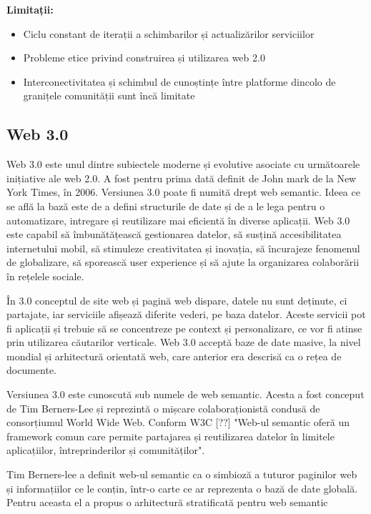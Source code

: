 \documentclass[12pt, a4paper]{report}
\begin{document}
\textbf{Limitații:}
\begin{itemize}
	\item Ciclu constant de iterații a schimbarilor și actualizărilor serviciilor
	\item Probleme etice privind construirea și utilizarea web 2.0
	\item Interconectivitatea și schimbul de cunoștințe între platforme dincolo de granițele comunității sunt încă limitate
\end{itemize}

\subsection{Web 3.0}

Web 3.0 este unul dintre subiectele moderne și evolutive asociate cu următoarele inițiative ale web 2.0. A fost pentru prima dată definit de John mark de la New York Times, în 2006. Versiunea 3.0 poate fi numită drept web semantic. Ideea ce se află la bază este de a defini structurile de date și de a le lega pentru o automatizare, intregare și reutilizare mai eficientă în diverse aplicații. Web 3.0 este capabil să îmbunătățească gestionarea datelor, să susțină accesibilitatea internetului mobil, să stimuleze creativitatea și inovația, să încurajeze fenomenul de globalizare, să sporească user experience și să ajute la organizarea colaborării în rețelele sociale.

În 3.0 conceptul de site web și pagină web dispare, datele nu sunt deținute, ci partajate, iar serviciile afișează diferite vederi, pe baza datelor. Aceste servicii pot fi aplicații și trebuie să se concentreze pe context și personalizare, ce vor fi atinse prin utilizarea căutarilor verticale. Web 3.0 acceptă baze de date masive, la nivel mondial și arhitectură orientată web, care anterior era descrisă ca o rețea de documente.

Versiunea 3.0 este cunoscută sub numele de web semantic. Acesta a fost conceput de Tim Berners-Lee și reprezintă o mișcare colaboraționistă condusă de consorțiumul World Wide Web. Conform W3C [??] "Web-ul semantic oferă un framework comun care permite partajarea și reutilizarea datelor în limitele aplicațiilor, întreprinderilor și comunităților".

Tim Berners-lee a definit web-ul semantic ca o simbioză a tuturor paginilor web și informațiilor ce le conțin, într-o carte ce ar reprezenta o bază de date globală. Pentru aceasta el a propus o arhitectură stratificată pentru web semantic
\end{document}
